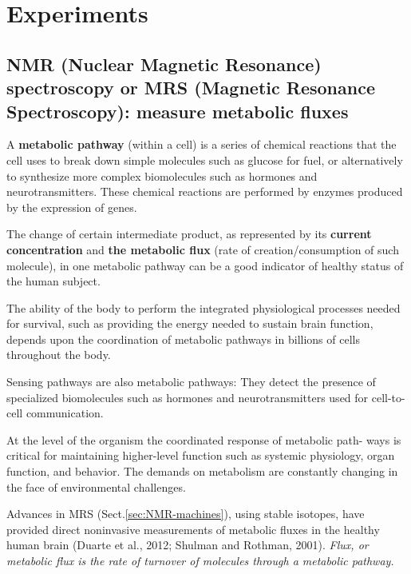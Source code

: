 \chapter{Experiments}

\section{NMR (Nuclear Magnetic Resonance) spectroscopy or MRS (Magnetic Resonance Spectroscopy): measure metabolic fluxes}
\label{sec:MRS}
\label{sec:NMR}

A {\bf metabolic pathway} (within a cell) is a series of chemical reactions that the
cell uses to break down simple molecules such as glucose for fuel, or
alternatively to synthesize more complex biomolecules such as hormones and
neurotransmitters.
These chemical reactions are performed by enzymes produced by the expression of
genes.

The change of certain intermediate product, as represented by its {\bf current
concentration} and {\bf the metabolic flux} (rate of creation/consumption of
such molecule), in one metabolic pathway can be a good indicator of healthy
status of the human subject.

The ability of the body to perform the integrated physiological processes needed
for survival, such as providing the energy needed to sustain brain function,
depends upon the coordination of metabolic pathways in billions of cells
throughout the body.

\begin{mdframed}

Sensing pathways are also metabolic pathways: They detect the presence of
specialized biomolecules such as hormones and neurotransmitters used for
cell-to-cell communication.

At the level of the organism the coordinated response of metabolic path- ways is
critical for maintaining higher-level function such as systemic physiology,
organ function, and behavior. The demands on metabolism are constantly changing
in the face of environmental challenges.

\end{mdframed}


Advances in MRS (Sect.\ref{sec:NMR-machines}), using stable isotopes, have
provided direct noninvasive measurements of metabolic fluxes in the healthy
human brain (Duarte et al., 2012; Shulman and Rothman, 2001).
{\it Flux, or metabolic flux is the rate of turnover of molecules through a
metabolic pathway.}

